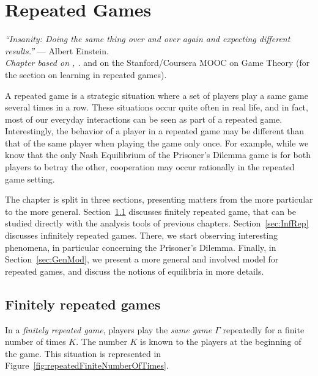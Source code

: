 \ifx \globalmark \undefined %
	
\else
\fi



\chapter{Repeated Games}
{\large{\itshape
``Insanity: Doing the same thing over and over again and expecting different results.''} --- Albert Einstein.\\
}
\label{chap:Rep}
{\small{\itshape
Chapter based on \cite[pages 308 - 331]{MyGTAO}, \cite[Section 6.1]{ShLeMSAG}.} and on
the Stanford/Coursera MOOC on Game Theory (for the section on learning in repeated games).\\
}

A repeated game is a strategic situation where a set of players play a same
game several times in a row. These situations occur quite often in real life,
and in fact, most of our everyday interactions can be seen as part of a
repeated game.\\
Interestingly, the behavior of a player in a repeated game may be different
than that of the same player when playing the game only once. For example,
while we know that the only Nash Equilibrium of the Prisoner's Dilemma game
is for both players to betray the other, cooperation may occur rationally
in the repeated game setting.

The chapter is split in three sections, presenting matters from the more
particular to the more general. Section~\ref{sec:FinRep} discusses finitely
repeated game, that can be studied directly with the analysis tools of
previous chapters. Section~\ref{sec:InfRep} discusses infinitely repeated
games. There, we start observing interesting phenomena, in particular
concerning the Prisoner's Dilemma. Finally, in Section~\ref{sec:GenMod}, we
present a more general and involved model for repeated games, and discuss
the notions of equilibria in more details.

\section{Finitely repeated games}
\label{sec:FinRep}
In a \emph{finitely repeated game}, players play the \emph{same game
$\Gamma$} repeatedly for a finite number of times $K$. The number $K$ is
known to the players at the beginning of the game. This situation is
represented in Figure~\ref{fig:repeatedFiniteNumberOfTimes}.

